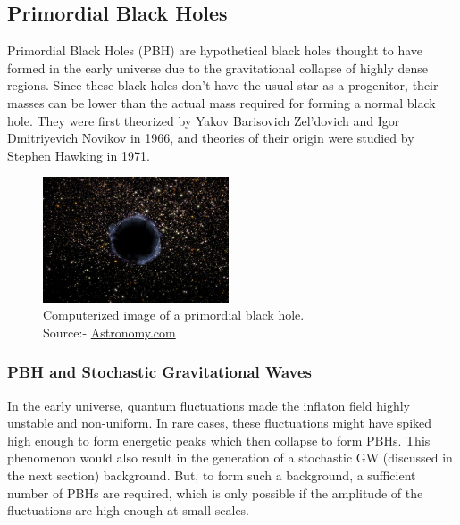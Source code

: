 \subsection{Primordial Black Holes}
Primordial Black Holes (PBH) are hypothetical black holes thought to have formed in the early universe due to the gravitational collapse of highly dense regions. Since these black holes don't have the usual star as a progenitor, their masses can be lower than the actual mass required for forming a normal black hole. They were first theorized by Yakov Barisovich Zel'dovich and Igor Dmitriyevich Novikov in 1966, and theories of their origin were studied by Stephen Hawking in 1971. \cite{PBH_defn}

\begin{figure}
\includegraphics[width=5.5cm]{images.tex/pbh.jpg}
\caption{Computerized image of a primordial black hole.\\
    Source:- \href{https://astronomy.com/news/2019/07/primordial-black-holes}{Astronomy.com}}
\end{figure}

\subsubsection{PBH and Stochastic Gravitational Waves}
In the early universe, quantum fluctuations made the inflaton field highly unstable and non-uniform. In rare cases, these fluctuations might have spiked high enough to form energetic peaks which then collapse to form PBHs. This phenomenon would also result in the generation of a stochastic GW (discussed in the next section) background. But, to form such a background, a sufficient number of PBHs are required, which is only possible if the amplitude of the fluctuations are high enough at small scales. \cite{Nakama_2017}\\

